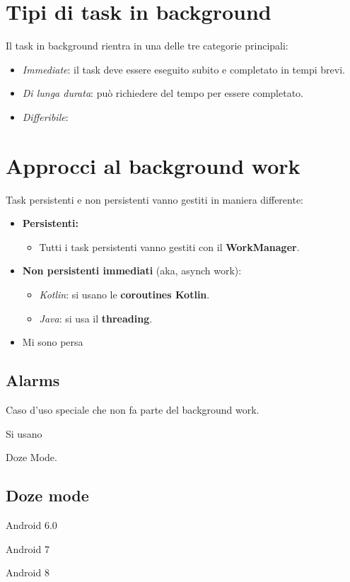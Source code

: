 \section{Tipi di task in background}
\par Il task in background rientra in una delle tre categorie principali:
\begin{itemize}
    \item \textit{Immediate}: il task deve essere eseguito subito e completato in tempi brevi.
    \item \textit{Di lunga durata}: può richiedere del tempo per essere completato.
    \item \textit{Differibile}: 
\end{itemize}

\section{Approcci al background work} %
\par Task persistenti e non persistenti vanno gestiti in maniera differente:
\begin{itemize}
    \item \textbf{Persistenti:}
    \begin{itemize}
        \item Tutti i task persistenti vanno gestiti con il \textbf{WorkManager}.
    \end{itemize}
    \item \textbf{Non persistenti immediati} (aka, asynch work):
    \begin{itemize}
        \item \textit{Kotlin}: si usano le \textbf{coroutines Kotlin}.
        \item \textit{Java}: si usa il \textbf{threading}.
    \end{itemize}
    \item Mi sono persa
\end{itemize}

\subsection{Alarms}
\par Caso d'uso speciale che non fa parte del background work.
\par Si usano
\par Doze Mode.

\subsection{Doze mode}
\par Android 6.0
\par Android 7
\par Android 8

